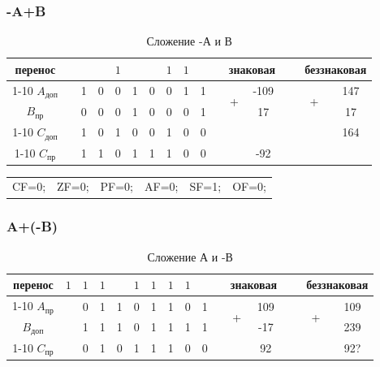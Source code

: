 \subsubsection{-A+B}

\begin{table}[H]
    \centering
    \caption{Сложение -А и В}
    \begin{tabular}{c|cc|cccccccp{1cm}ccp{0.5cm}cc}
		\small перенос & & & & $1$ & & & $1$ & $1$ & & & \multicolumn{2}{c}{знаковая} & \  & \multicolumn{2}{c}{беззнаковая}  \\
		\cline{1-10} \cline{12-13} \cline{15-16}
		$A_{\text{доп}}$ & & 1 & 0 & 0 & 1 & 0 & 0 & 1 & 1 & & \multirow{2}{*}{+} & -109 & \  & \multirow{2}{*}{+} & 147  \\
		$B_{\text{пр}}$ & & 0 & 0 & 0 & 1 & 0 & 0 & 0 & 1 & & & 17 & \  &  & 17 \\
		\cline{1-10} \cline{12-13} \cline{15-16}
		$C_{\text{доп}}$ & & 1 & 0 & 1 & 0 & 0 & 1 & 0 & 0 & & & & \  &  & 164 \\
		\cline{1-10} \cline{12-13} \cline{15-16}
		$C_{\text{пр}}$ & & 1 & 1 & 0 & 1 & 1 & 1 & 0 & 0 & & & -92 & \  &  & 
    \end{tabular}
\end{table}

\begin{table}[H]
    \centering
    \begin{tabular}{cccccc}
        CF=0; & ZF=0; & PF=0; & AF=0; & SF=1; & OF=0;
    \end{tabular}
\end{table}


\subsubsection{A+(-B)}

\begin{table}[H]
    \centering
    \caption{Сложение А и -В}
    \begin{tabular}{c|cc|cccccccp{1cm}ccp{0.5cm}cc}
		\small перенос & $1$ & $1$ & $1$ & & $1$ & $1$ & $1$ & $1$ & & & \multicolumn{2}{c}{знаковая} & \  & \multicolumn{2}{c}{беззнаковая}  \\
		\cline{1-10} \cline{12-13} \cline{15-16}
		$A_{\text{пр}}$ & & 0 & 1 & 1 & 0 & 1 & 1 & 0 & 1 & & \multirow{2}{*}{+} & 109 & \  & \multirow{2}{*}{+} & 109   \\
		$B_{\text{доп}}$ & & 1 & 1 & 1 & 0 & 1 & 1 & 1 & 1 & & & -17 & \  &  & 239 \\
		\cline{1-10} \cline{12-13} \cline{15-16}
		$C_{\text{пр}}$ & & 0 & 1 & 0 & 1 & 1 & 1 & 0 & 0 & & & 92 & \  &  & 92? \\
    \end{tabular}
\end{table}

